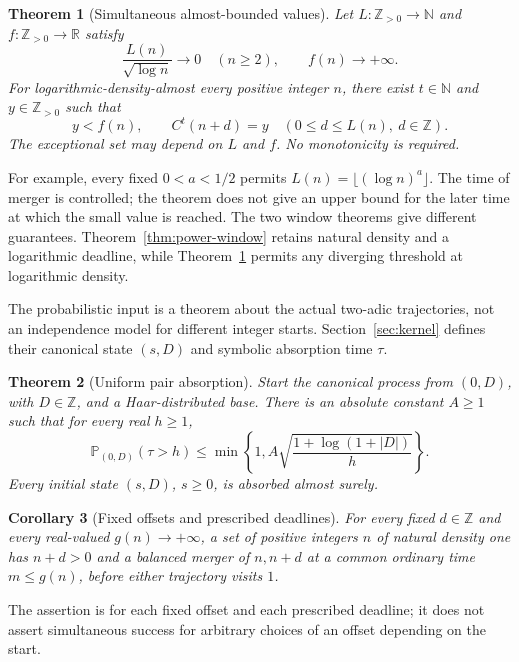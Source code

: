 \documentclass[11pt]{amsart}
\newtheorem{theorem}{Theorem}[section]
\newtheorem{corollary}[theorem]{Corollary}
\theoremstyle{definition}
\theoremstyle{remark}
\newcommand{\N}{\mathbb N}
\newcommand{\Z}{\mathbb Z}
\newcommand{\R}{\mathbb R}
\newcommand{\PP}{\mathbb P}
\begin{document}
\begin{theorem}[Simultaneous almost-bounded values]\label{thm:window}
Let $L:\Z_{>0}\to\N$ and $f:\Z_{>0}\to\R$ satisfy
\[
 \frac{L(n)}{\sqrt{\log n}}\longrightarrow0\quad(n\ge2),
 \qquad f(n)\longrightarrow+\infty.
\]
For logarithmic-density-almost every positive integer $n$, there exist $t\in\N$ and $y\in\Z_{>0}$ such that
\[
 y<f(n),\qquad C^t(n+d)=y\quad(0\le d\le L(n),\ d\in\Z).
\]
The exceptional set may depend on $L$ and $f$. No monotonicity is required.
\end{theorem}
For example, every fixed $0<a<1/2$ permits $L(n)=\lfloor(\log n)^a\rfloor$.
The time of merger is controlled; the theorem does not give an upper bound for the later time at which the small value is reached.
The two window theorems give different guarantees. Theorem~\ref{thm:power-window} retains natural density and a logarithmic deadline, while Theorem~\ref{thm:window} permits any diverging threshold at logarithmic density.

The probabilistic input is a theorem about the actual two-adic trajectories, not an independence model for different integer starts. Section~\ref{sec:kernel} defines their canonical state $(s,D)$ and symbolic absorption time $\tau$.
\begin{theorem}[Uniform pair absorption]\label{thm:pair}
Start the canonical process from $(0,D)$, with $D\in\Z$, and a Haar-distributed base. There is an absolute constant $A\ge1$ such that for every real $h\ge1$,
\[
 \PP_{(0,D)}(\tau>h)\le
 \min\left\{1,A\sqrt{\frac{1+\log(1+|D|)}{h}}\right\}.
\]
Every initial state $(s,D)$, $s\ge0$, is absorbed almost surely.
\end{theorem}

\begin{corollary}[Fixed offsets and prescribed deadlines]\label{cor:deadline}
For every fixed $d\in\Z$ and every real-valued $g(n)\to+\infty$, a set of positive integers $n$ of natural density one has $n+d>0$ and a balanced merger of $n,n+d$ at a common ordinary time $m\le g(n)$, before either trajectory visits $1$.
\end{corollary}
The assertion is for each fixed offset and each prescribed deadline; it does not assert simultaneous success for arbitrary choices of an offset depending on the start.
\end{document}
